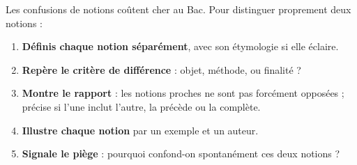 \documentclass[11pt]{article}
\begin{document}
\begin{methode}
Les confusions de notions coûtent cher au Bac. Pour distinguer proprement deux notions :

\begin{enumerate}
\item \textbf{Définis chaque notion séparément}, avec son étymologie si elle éclaire.
\item \textbf{Repère le critère de différence} : objet, méthode, ou finalité ?
\item \textbf{Montre le rapport} : les notions proches ne sont pas forcément opposées ; précise si l'une inclut l'autre, la précède ou la complète.
\item \textbf{Illustre chaque notion} par un exemple et un auteur.
\item \textbf{Signale le piège} : pourquoi confond-on spontanément ces deux notions ?
\end{enumerate}
\end{methode}
\end{document}
